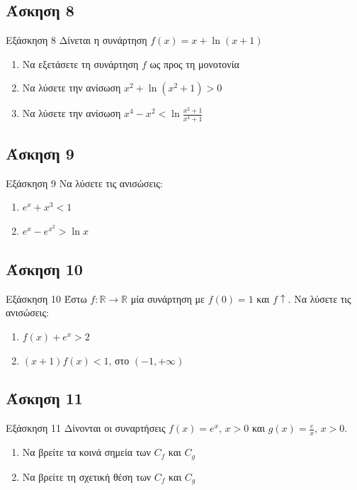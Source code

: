 \documentclass[greek]{beamer}
\begin{document}
\subsection{Άσκηση 8}
\begin{frame}[label=Άσκηση8,t]{Εξάσκηση 8}
      Δίνεται η συνάρτηση $f(x)=x+\ln (x+1)$
      \begin{enumerate}
            \item Να εξετάσετε τη συνάρτηση $f$ ως προς τη μονοτονία \pause
            \item Να λύσετε την ανίσωση $x^2+\ln (x^2+1)>0$ \pause
            \item Να λύσετε την ανίσωση $x^4-x^2<\ln \frac{x^2+1}{x^4+1}$
      \end{enumerate}
\end{frame}

\subsection{Άσκηση 9}
\begin{frame}[label=Άσκηση9,t]{Εξάσκηση 9}
      Να λύσετε τις ανισώσεις:
      \begin{enumerate}
            \item $e^x+x^3<1$ \pause
            \item $e^x-e^{x^2}>\ln x$
      \end{enumerate}
\end{frame}

\subsection{Άσκηση 10}
\begin{frame}[label=Άσκηση10,t]{Εξάσκηση 10}
      Έστω $f:\mathbb{R}\to\mathbb{R}$ μία συνάρτηση με $f(0)=1$ και $f\uparrow$. Να λύσετε τις ανισώσεις:
      \begin{enumerate}
            \item $f(x)+e^x>2$ \pause
            \item $(x+1)f(x)<1$, στο $(-1,+\infty)$
      \end{enumerate}
\end{frame}

\subsection{Άσκηση 11}
\begin{frame}[label=Άσκηση11,t]{Εξάσκηση 11}
      Δίνονται οι συναρτήσεις $f(x)=e^x$, $x>0$ και $g(x)=\frac{e}{x}$, $x>0$.
      \begin{enumerate}
            \item Να βρείτε τα κοινά σημεία των $C_f$ και $C_g$ \pause
            \item Να βρείτε τη σχετική θέση των $C_f$ και $C_g$
      \end{enumerate}
\end{frame}
\end{document}
